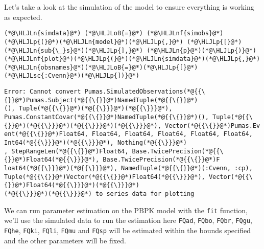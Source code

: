 \documentclass[12pt,a4paper]{article}
\newcommand{\HLJLn}[1]{#1}
\newcommand{\HLJLnf}[1]{\textcolor[RGB]{66,102,213}{#1}}
\newcommand{\HLJLsc}[1]{\textcolor[RGB]{201,61,57}{#1}}
\newcommand{\HLJLoB}[1]{\textcolor[RGB]{102,102,102}{\textbf{#1}}}
\newcommand{\HLJLp}[1]{#1}
\begin{document}
Let's take a look at the simulation of the model to ensure everything is working as expected.


\begin{lstlisting}
(*@\HLJLn{simdata}@*) (*@\HLJLoB{=}@*) (*@\HLJLnf{simobs}@*)(*@\HLJLp{(}@*)(*@\HLJLn{model}@*)(*@\HLJLp{,}@*) (*@\HLJLp{[}@*)(*@\HLJLn{sub{\_}s}@*)(*@\HLJLp{],}@*) (*@\HLJLn{p}@*)(*@\HLJLp{)}@*)
(*@\HLJLnf{plot}@*)(*@\HLJLp{(}@*)(*@\HLJLn{simdata}@*)(*@\HLJLp{,}@*) (*@\HLJLn{obsnames}@*)(*@\HLJLoB{=}@*)(*@\HLJLp{[}@*)(*@\HLJLsc{:Cvenn}@*)(*@\HLJLp{])}@*)
\end{lstlisting}

\begin{lstlisting}
Error: Cannot convert Pumas.SimulatedObservations(*@{{\{}}@*)Pumas.Subject(*@{{\{}}@*)NamedTuple(*@{{\{}}@*)
(), Tuple(*@{{\{}}@*)(*@{{\}}}@*)(*@{{\}}}@*), Pumas.ConstantCovar(*@{{\{}}@*)NamedTuple(*@{{\{}}@*)(), Tuple(*@{{\{}}@*)(*@{{\}}}@*)(*@{{\}}}@*)(*@{{\}}}@*), Vector(*@{{\{}}@*)Pumas.Ev
ent(*@{{\{}}@*)Float64, Float64, Float64, Float64, Float64, Float64, Int64(*@{{\}}}@*)(*@{{\}}}@*), Nothing(*@{{\}}}@*)
, StepRangeLen(*@{{\{}}@*)Float64, Base.TwicePrecision(*@{{\{}}@*)Float64(*@{{\}}}@*), Base.TwicePrecision(*@{{\{}}@*)F
loat64(*@{{\}}}@*)(*@{{\}}}@*), NamedTuple(*@{{\{}}@*)(:Cvenn, :cp), Tuple(*@{{\{}}@*)Vector(*@{{\{}}@*)Float64(*@{{\}}}@*), Vector(*@{{\{}}@*)Float64(*@{{\}}}@*)(*@{{\}}}@*)
(*@{{\}}}@*)(*@{{\}}}@*) to series data for plotting
\end{lstlisting}


We can run parameter estimation on the PBPK model with the \texttt{fit} function, we'll use the simulated data to run the estimation here \texttt{FQad}, \texttt{FQbo}, \texttt{FQbr}, \texttt{FQgu}, \texttt{FQhe}, \texttt{FQki}, \texttt{FQli}, \texttt{FQmu} and \texttt{FQsp} will be estimated within the bounds specified and the other parameters will be fixed.
\end{document}
